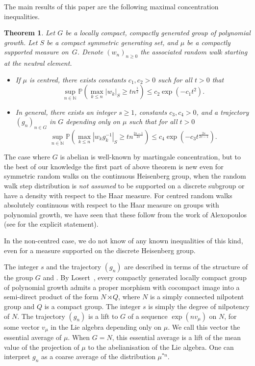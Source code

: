 \documentclass[11pt,leqno]{article}
\theoremstyle{plain}
\newtheorem{theorem}{Theorem}[section]
\theoremstyle{definition}
\theoremstyle{remark}
\numberwithin{equation}{section}
\begin{document}
The main results of this paper are the following maximal concentration
inequalities.

\begin{theorem}\label{thmIntro:NbyQ} 
Let $G$ be a locally compact, compactly generated group of polynomial
growth. Let $S$ be a compact symmetric generating set, and $\mu$ be a compactly supported measure on~$G$. Denote $(w_n)_{n\ge 0}$ the associated random walk starting at the neutral element.
\begin{itemize}
\item If $\mu$ is centred, there exists  constants $c_1,c_2>0$ such for all $t>0$
that 
\[
\sup_{n\in \mathbb{N}}\mathbb{P}\left(\max_{k\leq n}|w_{k}|_{S}\geq tn^{\frac{1}{2}}\right)\leq c_2\exp(-c_1t^{2}).
\]
\item In general, there exists an integer $s\ge 1$, constants $c_3,c_4>0$, and a trajectory $(g_n)_{n\in G}$ in $G$ depending only on $\mu$ such that for all $t>0$
\[
\sup_{n\in \mathbb{N}}\mathbb{P}\left(\max_{k\leq n}|w_{k}g_k^{-1}|_{S}\geq tn^{\frac{2s-1}{2s}}\right)\leq c_4\exp(-c_3t^{\frac{2s}{2s-1}}).
\]
\end{itemize}
\end{theorem} 

The case where
$G$ is abelian is well-known by martingale concentration, but to
the best of our knowledge the first part of above theorem is new even for symmetric
random walks on the continuous Heisenberg group, when the random walk step distribution is {\it not assumed} to be supported on a discrete subgroup or have a density with respect to the Haar measure. For centred random walks absolutely continuous with respect to the Haar measure on groups with polynomial growth, we have seen that these follow from the work of Alexopoulos (see \cite[(9.1)]{AlexopoulosLC} for the explicit statement).



In the non-centred case, we do not know of any known inequalities of this kind, even for a measure supported on the discrete Heisenberg group.


The integer $s$ and the trajectory $(g_n)$ are described in terms of the structure of the group $G$ and . By Losert~\cite{Losert}, every compactly generated locally compact group of polynomial growth admits a proper morphism with cocompact image into a semi-direct product of the form $N\rtimes Q$, where $N$ is a simply connected nilpotent group and $Q$ is a compact group. The integer $s$ is simply the degree of nilpotency of $N$. The trajectory $(g_n)$ is a lift to $G$ of a sequence $\exp(nv_\mu)$ on $N$, for some vector $v_\mu$ in the Lie algebra depending only on $\mu$. We call this vector the essential average of $\mu$. When $G=N$, this essential average is a lift of the mean value of the projection of $\mu$ to the abelianisation of the Lie algebra.
One can interpret $g_n$ as a coarse average of the distribution $\mu^{\ast n}$.
\end{document}

